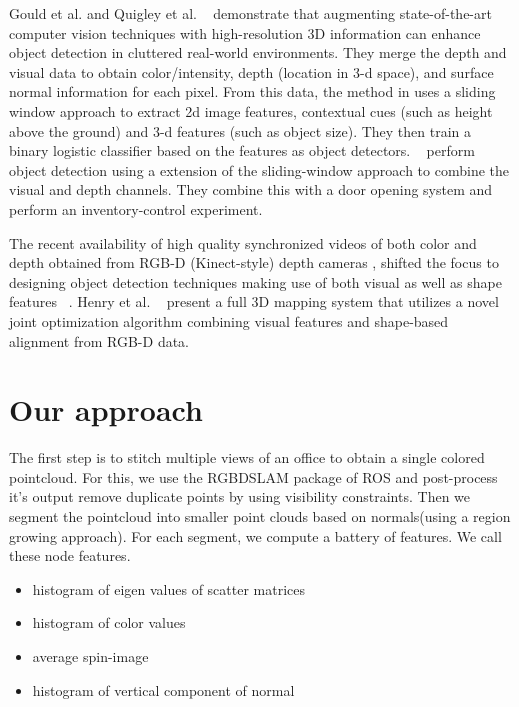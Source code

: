 \documentclass[11pt]{article} %
\begin{document}
   Gould et al.  \cite{gould:fusion} and Quigley et al. ~\cite{quigley:high-accuracy} demonstrate that augmenting state-of-the-art
   computer vision techniques with high-resolution 3D information can enhance object detection in cluttered real-world environments. 
   They merge the depth and visual data to obtain color/intensity, depth (location in 3-d space),  and surface normal information
   for each pixel. From this data, the method in \cite{gould:fusion} uses a sliding window approach to extract  2d image features, 
   contextual cues (such as height above the ground) and 3-d features (such as object size). They then train a binary logistic 
   classifier based on the features as object detectors. ~\cite{quigley:high-accuracy} perform object detection using a extension of 
   the sliding-window  approach to combine the visual and depth channels. They combine this with a door opening system and 
   perform an inventory-control experiment. 

   The recent availability of high quality synchronized videos of both color and depth obtained from RGB-D (Kinect-style) 
    depth cameras \cite{kinect}, shifted the focus to designing object detection techniques making use of both visual as well as 
    shape features ~\cite{lai:icra11a, lai:icra11b}. Henry et al. ~\cite{deter:rgbd} present a full 3D mapping system
    that utilizes a novel joint optimization algorithm combining visual features and shape-based alignment from RGB-D data.

\section{Our approach}
The first step is to stitch multiple views of an office to obtain a single colored pointcloud. 
For this, we use the RGBDSLAM package of ROS and post-process it's output remove duplicate points by using visibility constraints. Then we segment the pointcloud  into smaller point clouds based on normals(using a region growing approach). For each segment, we compute a battery of features. We call these node features.
\begin{itemize}
\item histogram of eigen values of scatter matrices
\item histogram of color values
\item average spin-image
\item histogram of vertical component of normal
\end{itemize}
\end{document}
